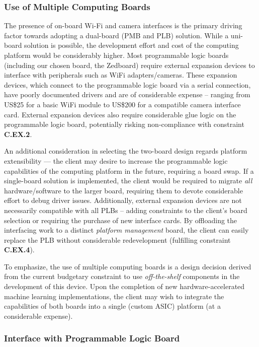 \subsubsection{Use of Multiple Computing Boards}
The presence of on-board Wi-Fi and camera interfaces is the primary driving factor towards adopting a dual-board (PMB and PLB) solution. While a uni-board solution is possible, the development effort and cost of the computing platform would be considerably higher. Most programmable logic boards (including our chosen board, the Zedboard) require external expansion devices to interface with peripherals such as WiFi adapters/cameras. These expansion devices, which connect to the programmable logic board via a serial connection, have poorly documented drivers and are of considerable expense -- ranging from US\$25 for a basic WiFi module\cite{digiwifi} to US\$200 for a compatible camera interface card\cite{digipmod}. External expansion devices also require considerable glue logic on the programmable logic board, potentially risking non-compliance with constraint \textbf{C.EX.2}.

An additional consideration in selecting the two-board design regards platform extensibility --- the client may desire to increase the programmable logic capabilities of the computing platform in the future, requiring a board swap. If a single-board solution is implemented, the client would be required to migrate \textit{all} hardware/software to the larger board, requiring them to devote considerable effort to debug driver issues. Additionally, external expansion devices are not necessarily compatible with all PLBs -- adding constraints to the client's board selection or requiring the purchase of new interface cards. By offloading the interfacing work to a distinct \textit{platform management} board, the client can easily replace the PLB without considerable redevelopment (fulfilling constraint \textbf{C.EX.4}). 

To emphasize, the use of multiple computing boards is a design decision derived from the current budgetary constraint to use \textit{off-the-shelf} components in the development of this device. Upon the completion of new hardware-accelerated machine learning implementations, the client may wish to integrate the capabilities of both boards into a single (custom ASIC) platform (at a considerable expense). 

\subsubsection{Interface with Programmable Logic Board}


